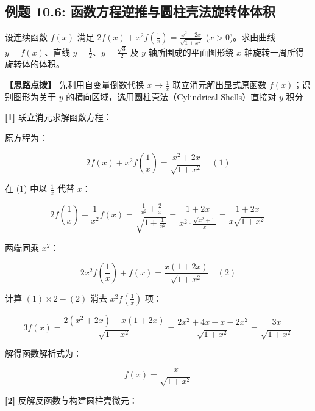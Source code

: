 \documentclass[11pt,a4paper,UTF8]{ctexart}
\begin{document}
\subsection{例题 10.6: 函数方程逆推与圆柱壳法旋转体体积}

设连续函数 $f(x)$ 满足 $2f(x) + x^2 f\left(\frac{1}{x}\right) = \frac{x^2+2x}{\sqrt{1+x^2}}$ ($x > 0$)。求由曲线 $y = f(x)$、直线 $y = \frac{1}{2}$、$y = \frac{\sqrt{3}}{2}$ 及 $y$ 轴所围成的平面图形绕 $x$ 轴旋转一周所得旋转体的体积。

\textbf{\color{DeepPurple}【思路点拨】} 先利用自变量倒数代换 $x \to \frac{1}{x}$ 联立消元解出显式原函数 $f(x)$；识别图形为关于 $y$ 的横向区域，选用圆柱壳法（Cylindrical Shells）直接对 $y$ 积分


\begin{solbox}[分步推导与答题规范]
\textbf{[1]} 联立消元求解函数方程：

原方程为：


\begin{equation*}
2f(x) + x^2 f\left(\frac{1}{x}\right) = \frac{x^2+2x}{\sqrt{1+x^2}} \quad (1)
\end{equation*}


在 (1) 中以 $\frac{1}{x}$ 代替 $x$：


\begin{equation*}
2f\left(\frac{1}{x}\right) + \frac{1}{x^2}f(x) = \frac{\frac{1}{x^2} + \frac{2}{x}}{\sqrt{1 + \frac{1}{x^2}}} = \frac{1+2x}{x^2 \cdot \frac{\sqrt{x^2+1}}{x}} = \frac{1+2x}{x\sqrt{1+x^2}}
\end{equation*}


两端同乘 $x^2$：


\begin{equation*}
2x^2 f\left(\frac{1}{x}\right) + f(x) = \frac{x(1+2x)}{\sqrt{1+x^2}} \quad (2)
\end{equation*}


计算 $(1) \times 2 - (2)$ 消去 $x^2 f\left(\frac{1}{x}\right)$ 项：


\begin{equation*}
3f(x) = \frac{2(x^2+2x) - x(1+2x)}{\sqrt{1+x^2}} = \frac{2x^2+4x - x - 2x^2}{\sqrt{1+x^2}} = \frac{3x}{\sqrt{1+x^2}}
\end{equation*}


解得函数解析式为：


\begin{equation*}
f(x) = \frac{x}{\sqrt{1+x^2}}
\end{equation*}


\textbf{[2]} 反解反函数与构建圆柱壳微元：


\end{solbox}
\end{document}

